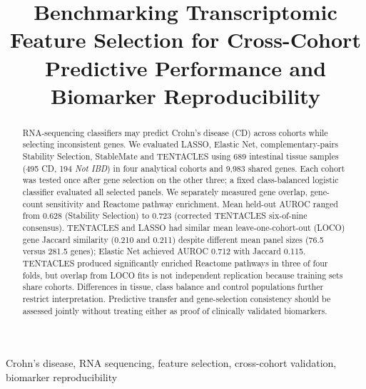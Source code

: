 \documentclass[conference,a4paper]{IEEEtran}
\begin{document}
\title{Benchmarking Transcriptomic Feature Selection for Cross-Cohort Predictive Performance and Biomarker Reproducibility}
\author{
}
\maketitle
\begin{abstract}
RNA-sequencing classifiers may predict Crohn's disease (CD) across cohorts while selecting inconsistent genes. We evaluated LASSO, Elastic Net, complementary-pairs Stability Selection, StableMate and TENTACLES using 689 intestinal tissue samples (495 CD, 194 \emph{Not IBD}) in four analytical cohorts and 9,983 shared genes. Each cohort was tested once after gene selection on the other three; a fixed class-balanced logistic classifier evaluated all selected panels. We separately measured gene overlap, gene-count sensitivity and Reactome pathway enrichment. Mean held-out AUROC ranged from 0.628 (Stability Selection) to 0.723 (corrected TENTACLES six-of-nine consensus). TENTACLES and LASSO had similar mean leave-one-cohort-out (LOCO) gene Jaccard similarity (0.210 and 0.211) despite different mean panel sizes (76.5 versus 281.5 genes); Elastic Net achieved AUROC 0.712 with Jaccard 0.115. TENTACLES produced significantly enriched Reactome pathways in three of four folds, but overlap from LOCO fits is not independent replication because training sets share cohorts. Differences in tissue, class balance and control populations further restrict interpretation. Predictive transfer and gene-selection consistency should be assessed jointly without treating either as proof of clinically validated biomarkers.
\end{abstract}
\begin{IEEEkeywords}
Crohn's disease, RNA sequencing, feature selection, cross-cohort validation, biomarker reproducibility
\end{IEEEkeywords}







\end{document}
